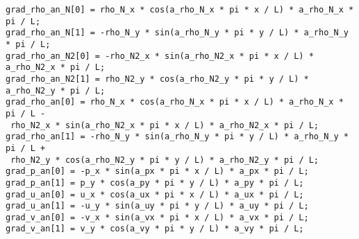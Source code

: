 \documentclass[10pt]{article}
\begin{document}
\begin{verbatim}
grad_rho_an_N[0] = rho_N_x * cos(a_rho_N_x * pi * x / L) * a_rho_N_x * pi / L;
grad_rho_an_N[1] = -rho_N_y * sin(a_rho_N_y * pi * y / L) * a_rho_N_y * pi / L;
grad_rho_an_N2[0] = -rho_N2_x * sin(a_rho_N2_x * pi * x / L) * a_rho_N2_x * pi / L;
grad_rho_an_N2[1] = rho_N2_y * cos(a_rho_N2_y * pi * y / L) * a_rho_N2_y * pi / L;
grad_rho_an[0] = rho_N_x * cos(a_rho_N_x * pi * x / L) * a_rho_N_x * pi / L -
 rho_N2_x * sin(a_rho_N2_x * pi * x / L) * a_rho_N2_x * pi / L;
grad_rho_an[1] = -rho_N_y * sin(a_rho_N_y * pi * y / L) * a_rho_N_y * pi / L +
 rho_N2_y * cos(a_rho_N2_y * pi * y / L) * a_rho_N2_y * pi / L;
grad_p_an[0] = -p_x * sin(a_px * pi * x / L) * a_px * pi / L;
grad_p_an[1] = p_y * cos(a_py * pi * y / L) * a_py * pi / L;
grad_u_an[0] = u_x * cos(a_ux * pi * x / L) * a_ux * pi / L;
grad_u_an[1] = -u_y * sin(a_uy * pi * y / L) * a_uy * pi / L;
grad_v_an[0] = -v_x * sin(a_vx * pi * x / L) * a_vx * pi / L;
grad_v_an[1] = v_y * cos(a_vy * pi * y / L) * a_vy * pi / L;
\end{verbatim}



%
 

\end{document}
